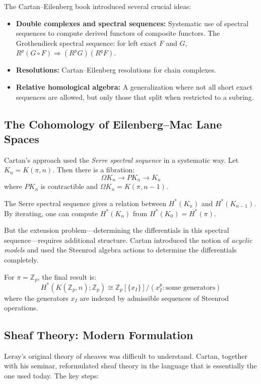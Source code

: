 The Cartan--Eilenberg book introduced several crucial ideas:
\begin{itemize}
    \item \textbf{Double complexes and spectral sequences:} Systematic use of spectral sequences to compute derived functors of composite functors. The Grothendieck spectral sequence: for left exact $F$ and $G$, $R^p(G \circ F) \Longrightarrow (R^p G)(R^q F)$.
    \item \textbf{Resolutions:} Cartan--Eilenberg resolutions for chain complexes.
    \item \textbf{Relative homological algebra:} A generalization where not all short exact sequences are allowed, but only those that split when restricted to a subring.
\end{itemize}

\subsection{The Cohomology of Eilenberg--Mac Lane Spaces}

Cartan's approach used the \textit{Serre spectral sequence} in a systematic way. Let $K_n = K(\pi, n)$. Then there is a fibration:
\[
\Omega K_n \to PK_n \to K_n
\]
where $PK_n$ is contractible and $\Omega K_n = K(\pi, n-1)$.

The Serre spectral sequence gives a relation between $H^*(K_n)$ and $H^*(K_{n-1})$. By iterating, one can compute $H^*(K_n)$ from $H^*(K_0) = H^*(\pi)$.

But the extension problem---determining the differentials in this spectral sequence---requires additional structure. Cartan introduced the notion of \textit{acyclic models} and used the Steenrod algebra actions to determine the differentials completely.

For $\pi = \mathbb{Z}_p$, the final result is:
\[
H^*(K(\mathbb{Z}_p, n); \mathbb{Z}_p) \cong \mathbb{Z}_p[\{x_I\}] / (x_I^p : \text{some generators})
\]
where the generators $x_I$ are indexed by admissible sequences of Steenrod operations.

\subsection{Sheaf Theory: Modern Formulation}

Leray's original theory of sheaves was difficult to understand. Cartan, together with his seminar, reformulated sheaf theory in the language that is essentially the one used today. The key steps:

